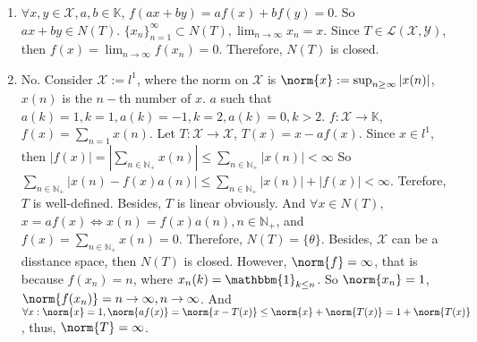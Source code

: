 \documentclass{ctexart}
\begin{document}
\begin{solution}
  \begin{enumerate}
    \item \(\forall x, y \in \mathcal{X}, a, b \in \mathbb{K}\), \(f(ax+by) = af(x)+bf(y) = 0\). So \(ax+by \in N(T)\).
      \(\{x_n\}_{n=1}^{\infty} \subset N(T), \lim_{n \to \infty} x_n = x \). 
      Since \(T \in \mathscr{L}(\mathcal{X}, \mathcal{Y})\), then \(f(x) = \lim_{n \to \infty} f(x_n) = 0 \).
      Therefore, \(N(T)\) is closed.
    \item No. Consider \(\mathcal{X}:= l^1\), where the norm on \(\mathcal{X}\) is \(\norm{x}:=\sup_{n \geq \infty} |x(n)|\), \(x(n)\) is the \(n-\)th number of \(x\).
        \(a\) such that \(a(k)=1, k =1, a(k) =-1, k =2, a(k) = 0, k >2\).
        \(f: \mathcal{X} \to \mathbb{K}\), \(f(x) = \sum_{n=1} x(n)\).
        Let \(T: \mathcal{X} \to \mathcal{X}\), \(T(x) = x - af(x)\). Since \(x \in l^1\), then \(|f(x)|= | \sum_{n \in \mathbb{N}_+} x(n)|\leq\sum_{n \in \mathbb{N}_+} |x(n)| < \infty\)
        So \(\sum_{n \in \mathbb{N}_+} |x(n)- f(x) a(n)| \leq \sum_{n \in \mathbb{N}_+} |x(n)|+ |f(x)| < \infty\).
        Terefore, \(T\) is well-defined. Besides, \(T\) is linear obviously. 
        And \(\forall x \in N(T)\), \(x=af(x) \iff x(n) = f(x) a(n), n \in \mathbb{N}_+ \), and \(f(x) =\sum_{n \in \mathbb{N}_+} x(n)=0\).
        Therefore, \(N(T)=\{\theta\}\). Besides, \(\mathcal{X}\) can be a disstance space, then \(N(T)\) is closed.
        However, \(\norm{f} = \infty\), that is because \(f(x_n) = n\), where \(x_n(k)=\mathbbm{1}_{k \leq n}\). 
        So \(\norm{x_n} = 1\), \(\norm{f(x_n)} = n \to \infty, n \to \infty\).
        And \(\forall x:\norm{x} = 1, \norm{af(x)} = \norm{x- T(x)} \leq \norm{x}+ \norm{T(x)}= 1+\norm{T(x)}\),
        thus, \(\norm{T} = \infty\).
    

\end{enumerate}
\end{solution}
\end{document}
